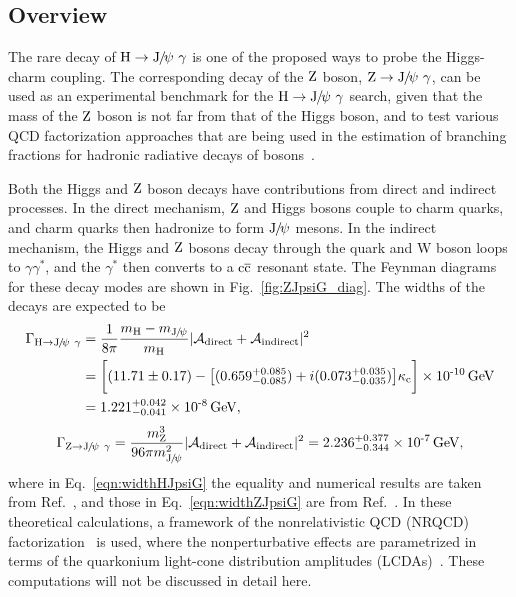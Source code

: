\subsection{Overview}
The rare decay of $\PH\to\JPsi\ \gamma$ is one of the proposed ways to probe the Higgs-charm coupling. The corresponding decay of the $\mathrm{Z}$ boson, $\mathrm{Z}\to{\mathrm{J}\hspace{-.08em}/\hspace{-.14em}\psi}\ \gamma$, can be used as an experimental benchmark for the $\PH\to\JPsi\ \gamma$ search, given that the mass of the $\mathrm{Z}$ boson is not far from that of the Higgs boson, and to test various QCD factorization approaches that are being used in the estimation of branching fractions for hadronic radiative decays of bosons~\cite{GUBERINA1980317,PhysRevD.92.014007,Grossmann:2015lea}.

Both the Higgs and $\mathrm{Z}$ boson decays have contributions from direct and indirect processes. In the direct mechanism, $\mathrm{Z}$ and Higgs bosons couple to charm quarks, and charm quarks then hadronize to form ${\mathrm{J}\hspace{-.08em}/\hspace{-.14em}\psi}$ mesons. 
In the indirect mechanism, the Higgs and $\mathrm{Z}$ bosons decay through the quark and W boson loops to 
$\gamma\gamma^{*}$, and the $\gamma^{*}$ then converts to a $\mathrm{c}\overline{\mathrm{c}}$ resonant state.  
The Feynman diagrams for these decay modes are shown in Fig.~\ref{fig:ZJpsiG_diag}. 
The widths of the decays are expected to be
\begin{equation}
\label{eqn:widthHJpsiG}
\begin{split}
\Gamma_{\mathrm{H}\to{\mathrm{J}\hspace{-.08em}/\hspace{-.14em}\psi}\ \gamma} & =\frac{1}{8\pi}\frac{m_{\mathrm{H}}-m_{{\mathrm{J}\hspace{-.08em}/\hspace{-.14em}\psi}}}{m_{\mathrm{H}}} |\mathcal{A}_{\text{direct}}+\mathcal{A}_{\text{indirect}}|^{2} \\
& = \bigg[(11.71\pm 0.17) - \big[(0.659^{+0.085}_{-0.085})+i(0.073^{+0.035}_{-0.035})\big]\kappa_{\mathrm{c}}\bigg]\times \text{10}^\text{-10}\,\text{Ge\hspace{-.08em}V} \\
& =1.221^{+0.042}_{-0.041}\times \text{10}^\text{-8}\,\text{Ge\hspace{-.08em}V},
\end{split}
\end{equation}
\begin{equation}
\label{eqn:widthZJpsiG}
\Gamma_{\mathrm{Z}\to{\mathrm{J}\hspace{-.08em}/\hspace{-.14em}\psi}\ \gamma}=\frac{m_{\mathrm{Z}}^{3}}{96\pi m_{{\mathrm{J}\hspace{-.08em}/\hspace{-.14em}\psi}}^{2}} |\mathcal{A}_{\text{direct}}+\mathcal{A}_{\text{indirect}}|^{2}= 2.236^{+0.377}_{-0.344}\times \text{10}^\text{-7}\,\text{Ge\hspace{-.08em}V},
\end{equation}
where in Eq.~\ref{eqn:widthHJpsiG} the equality and numerical results are taken from Ref.~\cite{Bodwin:2013gca,Bodwin:2017wdu}, and those in Eq.~\ref{eqn:widthZJpsiG} are from Ref.~\cite{Bodwin:2017pzj}.
In these theoretical calculations, a framework of the nonrelativistic QCD (NRQCD) factorization~\cite{PhysRevD.51.1125} is used, where the nonperturbative effects are parametrized in terms of the quarkonium light-cone distribution amplitudes (LCDAs)~\cite{PhysRevD.22.2157,Chernyak:1983ej}. These computations will not be discussed in detail here. 
